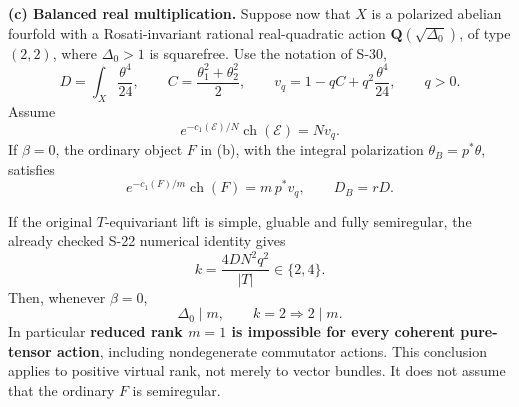 \begin{theorem}
\textbf{(c) Balanced real multiplication.} Suppose now that \(X\) is a polarized abelian fourfold with a Rosati-invariant rational real-quadratic action \(\mathbf Q(\sqrt{\Delta_0})\), of type \((2,2)\), where \(\Delta_0>1\) is squarefree. Use the notation of S-30, \[
 D=\int_X\frac{\theta^4}{24},\qquad
 C=\frac{\theta_1^2+\theta_2^2}{2},\qquad
 v_q=1-qC+q^2\frac{\theta^4}{24},\qquad q>0.
\] Assume \[
 e^{-c_1(\mathcal E)/N}\operatorname{ch}(\mathcal E)=Nv_q.
 \tag{S38.8}
\] If \(\beta=0\), the ordinary object \(F\) in (b), with the integral polarization \(\theta_B=p^*\theta\), satisfies \[
 e^{-c_1(F)/m}\operatorname{ch}(F)=m\,p^*v_q,
 \qquad D_B=rD.
 \tag{S38.9}
\]

If the original \(T\)-equivariant lift is simple, gluable and fully semiregular, the already checked S-22 numerical identity gives \[
 k=\frac{4DN^2q^2}{|T|}\in\{2,4\}.
 \tag{S38.10}
\] Then, whenever \(\beta=0\), \[
 \boxed{\Delta_0\mid m,\qquad k=2\Longrightarrow 2\mid m.}
 \tag{S38.11}
\] In particular \textbf{reduced rank \(m=1\) is impossible for every coherent pure-tensor action}, including nondegenerate commutator actions. This conclusion applies to positive virtual rank, not merely to vector bundles. It does not assume that the ordinary \(F\) is semiregular.
\end{theorem}
